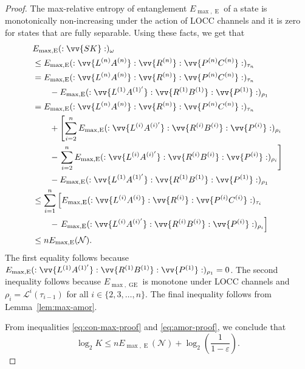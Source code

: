 \documentclass[aps,pra,twocolumn,superscriptaddress,longbibliography]{revtex4-1}
\def\GE{\operatorname{GE}}
\def\E{\operatorname{E}}
\newcommand{\mc}[1]{\mathcal{#1}}
\begin{document}
\begin{appendix}
\begin{proof}
The max-relative entropy of entanglement $E_{\max,\E}$ of a state is monotonically non-increasing under the action of LOCC channels and it is zero for states that are fully separable. Using these facts, we get that
\begin{align}
& E_{\max,\E}(:\vv{SK}:)_{\omega}\nonumber \\
&\leq E_{\max,\E}(:\vv{L^{(n)}A^{(n)}}:\vv{R^{(n)}}:\vv{P^{(n)}C^{(n)}}:)_{\tau_n} \label{eq:52}\\
&=  E_{\max,\E}(:\vv{L^{(n)}A^{(n)}}:\vv{R^{(n)}}:\vv{P^{(n)}C^{(n)}}:)_{\tau_n} \nonumber\\
&\qquad - E_{\max,\E}(:\vv{L^{(1)}A^{(1)'}}:\vv{R^{(1)}B^{(1)}}:\vv{P^{(1)}}:)_{\rho_1}\\ 
&=E_{\max,\E}(:\vv{L^{(n)}A^{(n)}}:\vv{R^{(n)}}:\vv{P^{(n)}C^{(n)}}:)_{\tau_n} \nonumber\\ 
&\qquad +\left[\sum_{i=2}^n E_{\max,\E}(:\vv{L^{(i)}A^{(i)'}}:\vv{R^{(i)}B^{(i)}}:\vv{P^{(i)}}:)_{\rho_{i}} \right.\nonumber \\
&\qquad  -\left. \sum_{i=2}^n E_{\max,\E}(:\vv{L^{(i)}A^{(i)'}}:\vv{R^{(i)}B^{(i)}}:\vv{P^{(i)}}:)_{\rho_{i}} \right]\nonumber \\
&\qquad - E_{\max,\E}(:\vv{L^{(1)}A^{(1)'}}:\vv{R^{(1)}B^{(1)}}:\vv{P^{(1)}}:)_{\rho_{1}}\\
& \leq \sum_{i=1}^n \left[ E_{\max,\E}(:\vv{L^{(i)}A^{(i)}}:\vv{R^{(i)}}:\vv{P^{(i)}C^{(i)}}:)_{\tau_{i}} \right. \nonumber\\
&\qquad -\left.  E_{\max,\E}(:\vv{L^{(i)}A^{(i)'}}:\vv{R^{(i)}B^{(i)}}:\vv{P^{(i)}}:)_{\rho_{i}} \right]\\
&\leq n E_{\max,\E}(\mc{N}).\label{eq:amor-proof}
\end{align}
The first equality follows because $E_{\max,\E}(:\vv{L^{(1)}A^{(1)'}}:\vv{R^{(1)}B^{(1)}}:\vv{P^{(1)}}:)_{\rho_{1}}=0$. The second inequality follows because $E_{\max,\GE}$ is monotone under LOCC channels and $\rho_{i}=\mc{L}^{i}(\tau_{i-1})$ for all $i\in\{2,3,\ldots,n\}$. The final inequality follows from Lemma~\ref{lem:max-amor}.

From inequalities \eqref{eq:con-max-proof} and \eqref{eq:amor-proof}, we conclude that
\begin{equation}
\log_2K\leq nE_{\max,\E}(\mc{N})+\log_2\left(\frac{1}{1-\varepsilon}\right).
\end{equation}
\end{proof}


\end{appendix}
\end{document}
